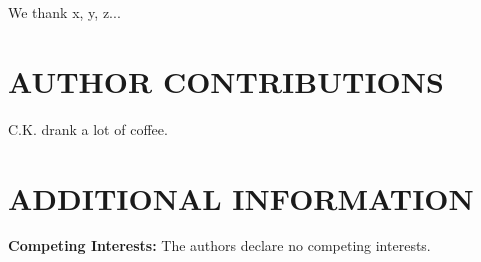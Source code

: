 \documentclass[prd,twocolumn,tightenlines,preprintnumbers,showpacs,superscriptaddress,notitlepage,nofootinbib,eqsecnum,floatfix,longbibliography,aps,10pt]{revtex4-2}
\begin{document}
We thank x, y, z...

\section{AUTHOR CONTRIBUTIONS}

C.K. drank a lot of coffee.

\section{ADDITIONAL INFORMATION}

\textbf{Competing Interests:} The authors declare no competing interests.



\end{document}
